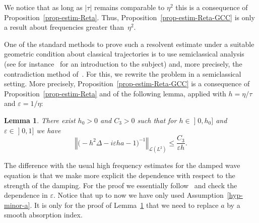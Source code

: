 \documentclass[11pt]{article}
\newtheorem{lemm}[theo]{Lemma}
\theoremstyle{definition}
\numberwithin{equation}{section}
\numberwithin{figure}{section}
\numberwithin{table}{section}
\newcommand{\abs}[1]{\left\vert #1\right\vert}
\newcommand{\nr}[1]{\left\Vert #1\right\Vert}
\renewcommand{\leq}{\leqslant}
\newcommand{\inv}{^{-1}}
\newcommand{\1}{\mathds 1}
\newcommand{\D}{\Delta}
\newcommand{\e}{\varepsilon}
\renewcommand{\t}{\tau}
\newcommand{\Lc}{{\mathcal L}}
\begin{document}
We notice that as long as $\abs \t$ remains comparable to $\eta^2$ this is a consequence of Proposition~\ref{prop-estim-Reta}. Thus, Proposition~\ref{prop-estim-Reta-GCC} is only a result about frequencies greater than~$\eta^2$.

One of the standard methods to prove such a resolvent estimate under a suitable geometric condition about classical trajectories is to use semiclassical analysis (see for instance~\cite{zworski} for an introduction to the subject) and, more precisely, the contradiction method of~\cite{Lebeau96}. For this, we rewrite the problem in a semiclassical setting. More precisely, Proposition~\ref{prop-estim-Reta-GCC} is a consequence of Proposition~\ref{prop-estim-Reta} and of the following lemma, applied with $h = \eta / \t$ and $\e = 1/\eta$:

\begin{lemm}\label{lem-high-freq}
There exist $h_0 > 0$ and $C_3 > 0$ such that for $h \in\mathopen{]}0,h_0]$ and $\e \in\mathopen{]}0,1]$ we have
\[
\nr{\big(-h^2 \D - i \e h a - 1 \big) \inv}_{\Lc(L^2)} \leq \frac {C_3} {\e h}.
\]
\end{lemm}

The difference with the usual high frequency estimates for the damped wave equation is that we make more explicit the dependence with respect to the strength of the damping. For the proof we essentially follow~\cite{BurqJo} and check the dependence in $\e$. Notice that up to now we have only used Assumption~\eqref{hyp-minor-a}. It is only for the proof of Lemma~\ref{lem-high-freq} that we need to replace $a$ by a smooth absorption index.
\end{document}

